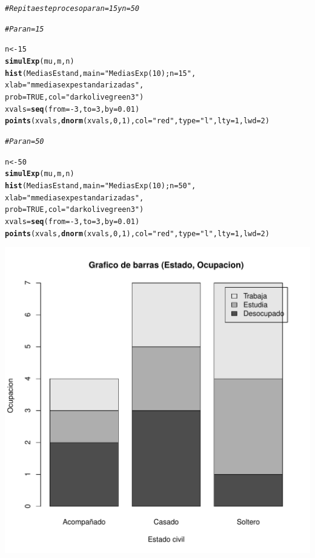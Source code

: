 \documentclass[12pt,letterpaper]{article}\usepackage[]{graphicx}\usepackage[]{color}
\makeatletter
\def\maxwidth{ %
  \ifdim\Gin@nat@width>\linewidth
    \linewidth
  \else
    \Gin@nat@width
  \fi
}
\newcommand{\hlnum}[1]{\textcolor[rgb]{0.686,0.059,0.569}{#1}}%
\newcommand{\hlstr}[1]{\textcolor[rgb]{0.192,0.494,0.8}{#1}}%
\newcommand{\hlcom}[1]{\textcolor[rgb]{0.678,0.584,0.686}{\textit{#1}}}%
\newcommand{\hlopt}[1]{\textcolor[rgb]{0,0,0}{#1}}%
\newcommand{\hlstd}[1]{\textcolor[rgb]{0.345,0.345,0.345}{#1}}%
\newcommand{\hlkwb}[1]{\textcolor[rgb]{0.69,0.353,0.396}{#1}}%
\newcommand{\hlkwc}[1]{\textcolor[rgb]{0.333,0.667,0.333}{#1}}%
\newcommand{\hlkwd}[1]{\textcolor[rgb]{0.737,0.353,0.396}{\textbf{#1}}}%
\newenvironment{kframe}{%
 \def\at@end@of@kframe{}%
 \ifinner\ifhmode%
  \def\at@end@of@kframe{\end{minipage}}%
  \begin{minipage}{\columnwidth}%
 \fi\fi%
 \def\FrameCommand##1{\hskip\@totalleftmargin \hskip-\fboxsep
 \colorbox{shadecolor}{##1}\hskip-\fboxsep
     \hskip-\linewidth \hskip-\@totalleftmargin \hskip\columnwidth}%
 \MakeFramed {\advance\hsize-\width
   \@totalleftmargin\z@ \linewidth\hsize
   \@setminipage}}%
 {\par\unskip\endMakeFramed%
 \at@end@of@kframe}
\newenvironment{knitrout}{}{} %
\makeatother
\begin{document}
\begin{enumerate}
\begin{knitrout}
\begin{kframe}
\begin{alltt}
\hlcom{# Repita este proceso para n=15 y n=50}

\hlcom{# Para n=15}

\hlstd{n} \hlkwb{<-} \hlnum{15}
\hlkwd{simulExp}\hlstd{(mu, m, n)}
\hlkwd{hist}\hlstd{(MediasEstand,} \hlkwc{main}\hlstd{=}\hlstr{"Medias Exp(10); n=15"}\hlstd{,}
     \hlkwc{xlab}\hlstd{=}\hlstr{"m medias exp estandarizadas"}\hlstd{,}
\hlkwc{prob}\hlstd{=}\hlnum{TRUE}\hlstd{,} \hlkwc{col}\hlstd{=}\hlstr{"darkolivegreen3"}\hlstd{)}
\hlstd{xvals} \hlkwb{=} \hlkwd{seq}\hlstd{(}\hlkwc{from}\hlstd{=}\hlopt{-}\hlnum{3}\hlstd{,} \hlkwc{to}\hlstd{=}\hlnum{3}\hlstd{,} \hlkwc{by}\hlstd{=}\hlnum{0.01}\hlstd{)}
\hlkwd{points}\hlstd{(xvals,} \hlkwd{dnorm}\hlstd{(xvals,} \hlnum{0}\hlstd{,} \hlnum{1}\hlstd{),} \hlkwc{col} \hlstd{=} \hlstr{"red"}\hlstd{,} \hlkwc{type}\hlstd{=}\hlstr{"l"}\hlstd{,} \hlkwc{lty}\hlstd{=}\hlnum{1}\hlstd{,} \hlkwc{lwd}\hlstd{=}\hlnum{2}\hlstd{)}

\hlcom{# Para n=50}

\hlstd{n} \hlkwb{<-} \hlnum{50}
\hlkwd{simulExp}\hlstd{(mu, m, n)}
\hlkwd{hist}\hlstd{(MediasEstand,} \hlkwc{main}\hlstd{=}\hlstr{"Medias Exp(10); n=50"}\hlstd{,}
     \hlkwc{xlab}\hlstd{=}\hlstr{"m medias exp estandarizadas"}\hlstd{,}
\hlkwc{prob}\hlstd{=}\hlnum{TRUE}\hlstd{,} \hlkwc{col}\hlstd{=}\hlstr{"darkolivegreen3"}\hlstd{)}
\hlstd{xvals} \hlkwb{=} \hlkwd{seq}\hlstd{(}\hlkwc{from}\hlstd{=}\hlopt{-}\hlnum{3}\hlstd{,} \hlkwc{to}\hlstd{=}\hlnum{3}\hlstd{,} \hlkwc{by}\hlstd{=}\hlnum{0.01}\hlstd{)}
\hlkwd{points}\hlstd{(xvals,} \hlkwd{dnorm}\hlstd{(xvals,} \hlnum{0}\hlstd{,} \hlnum{1}\hlstd{),} \hlkwc{col} \hlstd{=} \hlstr{"red"}\hlstd{,} \hlkwc{type}\hlstd{=}\hlstr{"l"}\hlstd{,} \hlkwc{lty}\hlstd{=}\hlnum{1}\hlstd{,} \hlkwc{lwd}\hlstd{=}\hlnum{2}\hlstd{)}
\end{alltt}
\end{kframe}
\includegraphics[width=\maxwidth]{figure/unnamed-chunk-6-1} 


\end{knitrout}
\end{enumerate}
\end{document}
